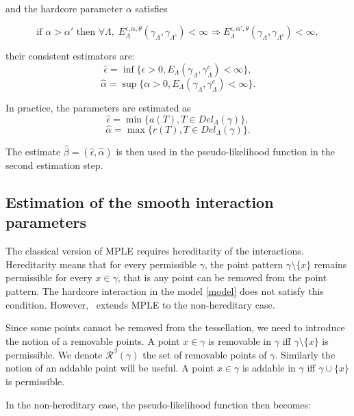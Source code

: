 \documentclass[12pt,a4paper]{report}
\begin{document}
and the hardcore parameter $\alpha$ satisfies

$$ \text{if } \alpha > \alpha' \text{ then  } \forall \Lambda, \; E^{\epsilon,\alpha,\theta}_\Lambda(\gamma_\Lambda,\gamma_{\Lambda^c}) < \infty \Rightarrow  E^{\epsilon,\alpha',\theta}_\Lambda(\gamma_\Lambda,\gamma_{\Lambda^c})<\infty,$$ 

their consistent estimators are:
$$\hat\epsilon = \inf\{\epsilon > 0, E_\Lambda(\gamma_\Lambda, \gamma_\Lambda^c) < \infty \},$$
$$\hat\alpha = \sup\{\alpha > 0, E_\Lambda(\gamma_\Lambda, \gamma_\Lambda^c) < \infty \}.$$

In practice, the parameters are estimated as
$$\hat\epsilon = \min\{a(T), T\in Del_\Lambda(\gamma)\},$$
$$\hat\alpha = \max\{r(T), T\in Del_\Lambda(\gamma)\}.$$

The estimate $\hat\beta = (\hat\epsilon,\hat\alpha)$ is then used in the pseudo-likelihood function in the second estimation step.


\subsection{Estimation of the smooth interaction parameters}


The classical version of MPLE requires hereditarity of the interactions. Hereditarity means that for every permissible $\gamma$, the point pattern $\gamma\setminus\{x\}$ remains permissible for every $x\in\gamma$, that is any point can be removed from the point pattern. The hardcore interaction in the model \ref{model} does not satisfy this condition. However,~\cite{DL07} extends MPLE to the non-hereditary case. 

Since some points cannot be removed from the tessellation, we need to introduce the notion of a removable points. A point $x\in\gamma$ is removable in $\gamma$ iff $\gamma\setminus\{x\}$ is permissible. We denote $\mathcal R^\beta(\gamma)$ the set of removable points of $\gamma$. Similarly the notion of an addable point will be useful. A point $x\in\gamma$ is addable in $\gamma$ iff $\gamma \cup \{x\}$ is permissible.


In the non-hereditary case, the pseudo-likelihood function then becomes:
\end{document}
